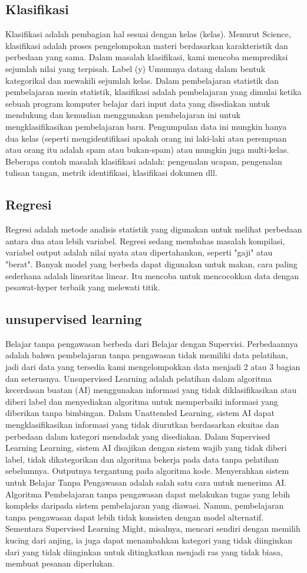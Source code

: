 \subsection{Klasifikasi}
Klasifikasi adalah pembagian hal sesuai dengan kelas (kelas). Menurut Science, klasifikasi adalah proses pengelompokan materi berdasarkan karakteristik dan perbedaan yang sama. Dalam masalah klasifikasi, kami mencoba memprediksi sejumlah nilai yang terpisah. Label (y) Umumnya datang dalam bentuk kategorikal dan mewakili sejumlah kelas. Dalam pembelajaran statistik dan pembelajaran mesin statistik, klasifikasi adalah pembelajaran yang dimulai ketika sebuah program komputer belajar dari input data yang disediakan untuk mendukung dan kemudian menggunakan pembelajaran ini untuk mengklasifikasikan pembelajaran baru. Pengumpulan data ini mungkin hanya dua kelas (seperti mengidentifikasi apakah orang ini laki-laki atau perempuan atau orang itu adalah spam atau bukan-spam) atau mungkin juga multi-kelas. Beberapa contoh masalah klasifikasi adalah: pengenalan ucapan, pengenalan tulisan tangan, metrik identifikasi, klasifikasi dokumen dll.
\subsection{Regresi}
Regresi adalah metode analisis statistik yang digunakan untuk melihat perbedaan antara dua atau lebih variabel. Regresi sedang membahas masalah kompilasi, variabel output adalah nilai nyata atau dipertahankan, seperti "gaji" atau "berat". Banyak model yang berbeda dapat digunakan untuk makan, cara paling sederhana adalah linearitas linear. Itu mencoba untuk mencocokkan data dengan pesawat-hyper terbaik yang melewati titik.
\subsection{unsupervised learning}
Belajar tanpa pengawasan berbeda dari Belajar dengan Supervisi. Perbedaannya adalah bahwa pembelajaran tanpa pengawasan tidak memiliki data pelatihan, jadi dari data yang tersedia kami mengelompokkan data menjadi 2 atau 3 bagian dan seterusnya. Unsupervised Learning adalah pelatihan dalam algoritma kecerdasan buatan (AI) menggunakan informasi yang tidak diklasifikasikan atau diberi label dan menyediakan algoritma untuk memperbaiki informasi yang diberikan tanpa bimbingan. Dalam Unattended Learning, sistem AI dapat mengklasifikasikan informasi yang tidak diurutkan berdasarkan ekuitas dan perbedaan dalam kategori mendadak yang disediakan. Dalam Supervised Learning Learning, sistem AI disajikan dengan sistem wajib yang tidak diberi label, tidak dikategorikan dan algoritma bekerja pada data tanpa pelatihan sebelumnya. Outputnya tergantung pada algoritma kode. Menyerahkan sistem untuk Belajar Tanpa Pengawasan adalah salah satu cara untuk menerima AI. Algoritma Pembelajaran tanpa pengawasan dapat melakukan tugas yang lebih kompleks daripada sistem pembelajaran yang diawasi. Namun, pembelajaran tanpa pengawasan dapat lebih tidak konsisten dengan model alternatif. Sementara Supervised Learning Might, misalnya, mencari sendiri dengan memilih kucing dari anjing, ia juga dapat menambahkan kategori yang tidak diinginkan dari yang tidak diinginkan untuk ditingkatkan menjadi ras yang tidak biasa, membuat pesanan diperlukan.
